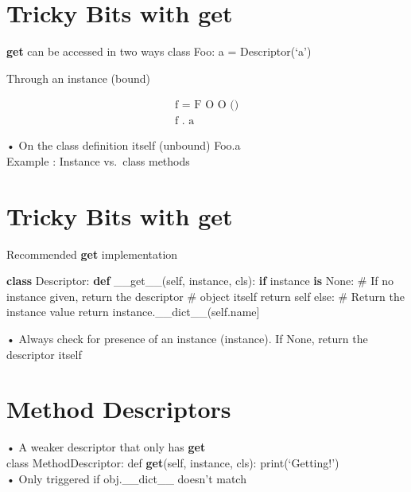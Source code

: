 \documentclass[
  letterpaper,
  DIV=11,
  numbers=noendperiod]{scrreprt}
\newenvironment{Shaded}{\begin{snugshade}}{\end{snugshade}}
\newcommand{\CommentTok}[1]{\textcolor[rgb]{0.37,0.37,0.37}{#1}}
\newcommand{\ControlFlowTok}[1]{\textcolor[rgb]{0.00,0.23,0.31}{\textbf{#1}}}
\newcommand{\FunctionTok}[1]{\textcolor[rgb]{0.28,0.35,0.67}{#1}}
\newcommand{\KeywordTok}[1]{\textcolor[rgb]{0.00,0.23,0.31}{\textbf{#1}}}
\newcommand{\NormalTok}[1]{\textcolor[rgb]{0.00,0.23,0.31}{#1}}
\newcommand{\VariableTok}[1]{\textcolor[rgb]{0.07,0.07,0.07}{#1}}
\begin{document}
\chapter{Tricky Bits with get}\label{tricky-bits-with-get}

\textbf{get} can be accessed in two ways class Foo: a = Descriptor(`a')

Through an instance (bound)

\[
\begin{array}{l} \text {f = F O O ()} \\ \text {f . a} \end{array}
\]

• On the class definition itself (unbound) Foo.a\\
Example : Instance vs.~class methods


\chapter{Tricky Bits with get}\label{tricky-bits-with-get-1}

Recommended \textbf{get} implementation

\begin{Shaded}
\begin{Highlighting}[]
\KeywordTok{class}\NormalTok{ Descriptor: }\KeywordTok{def} \FunctionTok{\_\_get\_\_}\NormalTok{(}\VariableTok{self}\NormalTok{, instance, cls): }\ControlFlowTok{if}\NormalTok{ instance }\KeywordTok{is} \VariableTok{None}\NormalTok{: }\CommentTok{\# If no instance given, return the descriptor \# object itself return self else: \# Return the instance value return instance.\_\_dict\_\_(self.name] }
\end{Highlighting}
\end{Shaded}

• Always check for presence of an instance (instance). If None, return
the descriptor itself


\chapter{Method Descriptors}\label{method-descriptors}

• A weaker descriptor that only has \textbf{get}\\
class MethodDescriptor: def \textbf{get}(self, instance, cls):
print(`Getting!')\\
• Only triggered if obj.\_\_dict\_\_ doesn't match
\end{document}
